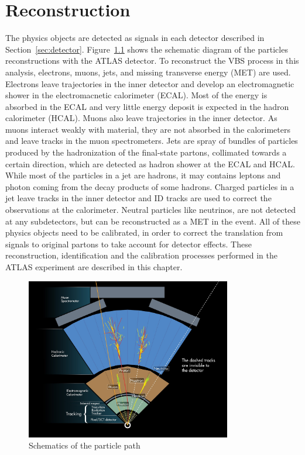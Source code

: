 \chapter{Reconstruction}
\label{chap:reconstruction}
The physics objects are detected as signals in each detector described in Section~\ref{sec:detector}.
Figure~\ref{fig:ParticlePath} shows the schematic diagram of the particles reconstructions with the ATLAS detector. 
To reconstruct the VBS process in this analysis, electrons, muons, jets, and missing transverse energy (MET) are used.
Electrons leave trajectories in the inner detector and develop an electromagnetic shower in the electromacnetic calorimeter (ECAL). 
Most of the energy is absorbed in the ECAL and very little energy deposit is expected in the hadron calorimeter (HCAL).
Muons also leave trajectories in the inner detector.
As muons interact weakly with material, they are not absorbed in the calorimeters and leave tracks in the muon spectrometers.
Jets are spray of bundles of particles produced by the hadronization of the final-state partons, collimated towards a certain direction, which are detected as hadron shower at the ECAL and HCAL. While most of the particles in a jet are hadrons, it may contains leptons and photon coming from the decay products of some hadrons. 
Charged particles in a jet leave tracks in the inner detector and ID tracks are used to correct the observations at the calorimeter. Neutral particles like neutrinos, are not detected at any subdetectors, but can be reconstructed as a MET in the event.
All of these physics objects need to be calibrated, in order to correct the translation from signals to original partons to take account for detector effects.
These reconstruction, identification and the calibration processes performed in the ATLAS experiment are described in this chapter.

\begin{figure}[tbp]
\begin{center}
 \includegraphics[width=0.80\textwidth,keepaspectratio]{figures/Reconstruction/ParticlePath}
\caption{
Schematics of the particle path
}
\label{fig:ParticlePath}
\end{center}
\end{figure}
